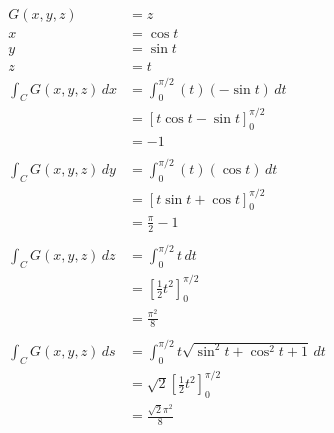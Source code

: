 \documentclass{article}
\begin{document}
\setcounter{subsubsection}{4}
\subsubsection{}

\begin{align*}
  G(x, y, z)             & = z                                                      \\
  x                      & = \cos t                                                 \\
  y                      & = \sin t                                                 \\
  z                      & = t                                                      \\
  \int_C G(x, y, z) \,dx & = \int_0^{\pi / 2} (t) (-\sin t) \,dt                    \\
                         & = [t \cos t - \sin t]_0^{\pi / 2}                        \\
                         & = -1                                                     \\ \\
  \int_C G(x, y, z) \,dy & = \int_0^{\pi / 2} (t) (\cos t) \,dt                     \\
                         & = [t \sin t + \cos t]_0^{\pi / 2}                        \\
                         & = \frac{\pi}{2} - 1                                      \\ \\
  \int_C G(x, y, z) \,dz & = \int_0^{\pi / 2} t \,dt                                \\
                         & = \left[ \frac{1}{2} t^2 \right]_0^{\pi / 2}             \\
                         & = \frac{\pi^2}{8}                                        \\ \\
  \int_C G(x, y, z) \,ds & = \int_0^{\pi / 2} t \sqrt{\sin^2 t + \cos^2 t + 1} \,dt \\
                         & = \sqrt{2} \left[ \frac{1}{2} t^2 \right]_0^{\pi / 2}    \\
                         & = \frac{\sqrt{2} \pi^2}{8}
\end{align*}

\setcounter{subsubsection}{6}
\subsubsection{}
\end{document}
